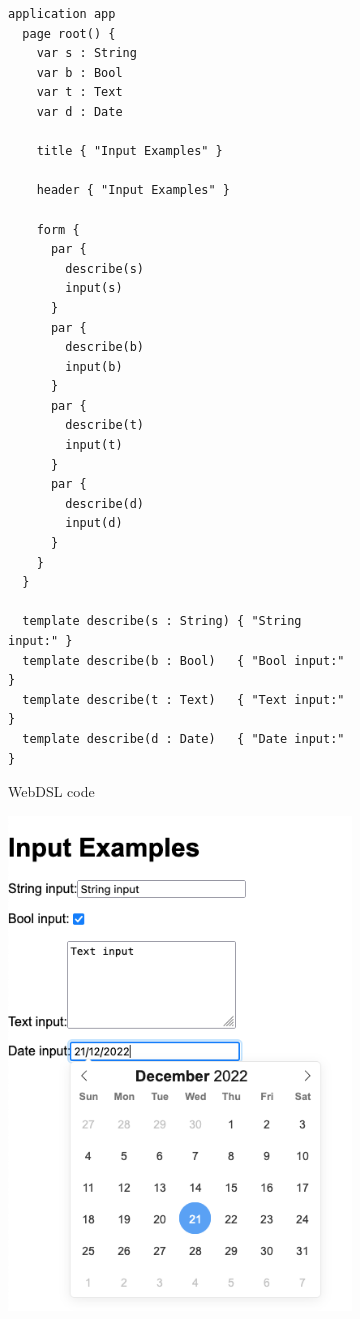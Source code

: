      \begin{figure}
        \begin{subfigure}[t]{0.45\textwidth}
          \begin{verbatim}
application app
  page root() {
    var s : String
    var b : Bool
    var t : Text
    var d : Date

    title { "Input Examples" }

    header { "Input Examples" }

    form {
      par {
        describe(s)
        input(s)
      }
      par {
        describe(b)
        input(b)
      }
      par {
        describe(t)
        input(t)
      }
      par {
        describe(d)
        input(d)
      }
    }
  }

  template describe(s : String) { "String input:" }
  template describe(b : Bool)   { "Bool input:"   }
  template describe(t : Text)   { "Text input:"   }
  template describe(d : Date)   { "Date input:"   }
          \end{verbatim}
          \caption{\label{fig:webdsl-template-overloading-webdsl}WebDSL code}
        \end{subfigure}
        \begin{subfigure}[t]{0.55\textwidth}
          \capstart
          \includegraphics[width=\textwidth]{../img/webdsl-template-overloading}

\end{subfigure}
\end{figure}

